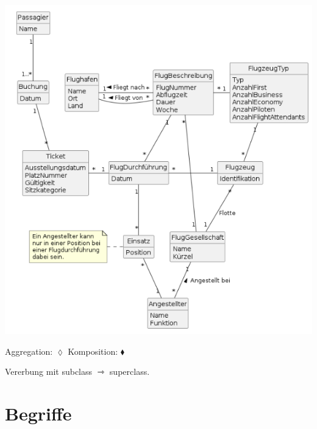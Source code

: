 \begin{multicols*}{3}
\includegraphics[height=\columnwidth-2em,angle=90]{uml2.png}

Aggregation: $\lozenge$ Komposition: $\blacklozenge $

Vererbung mit subclass {\huge$\rightarrowtriangle$} superclass.

\section{Begriffe}


\end{multicols*}
